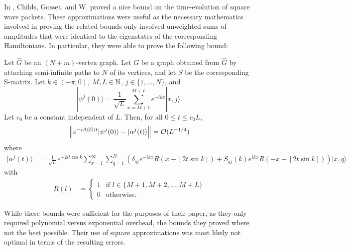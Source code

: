 \documentclass[../thesis-main/thesis-main]{subfiles}
\begin{document}
In \cite{MPQW}, Childs, Gosset, and W. proved a nice bound on the time-evolution of square wave packets.  These approximations were useful as the necessary mathematics involved in proving the related bounds only involved unweighted sums of amplitudes that were identical to the eigenstates of the corresponding Hamiltonians.  In particular, they were able to prove the following bound:
\begin{theorem}
Let $\widehat{G}$ be an $(N+m)$-vertex graph. Let $G$ be a graph obtained from $\widehat{G}$ by attaching semi-infinite paths to $N$ of its vertices, and let $S$ be the corresponding S-matrix.  Let $k\in(-\pi,0)$, $M,L\in\mathbb{N}$, $j\in\{1,\ldots,N\}$, and
\begin{equation}
  |\psi^{j}(0)\rangle=\frac{1}{\sqrt{L}}\sum_{x=M+1}^{M+L}e^{-ikx}|x,j\rangle.
\end{equation}
Let $c_{0}$ be a constant independent of $L$. Then, for all $0\leq t\leq c_{0}L$,
\begin{equation}
  \left\Vert e^{-iA(G) t}|\psi^{j}(0)\rangle-|\alpha^{j}(t)\rangle\right\Vert =\mathcal{O}(L^{-{1}/{4}})
\end{equation}
where 
\begin{align}
  |\alpha^{j}(t)\rangle & =  \frac{1}{\sqrt{L}}e^{-2it\cos k}\sum_{x=1}^{\infty}\sum_{q=1}^{N}\left(\delta_{qj} e^{-ikx}R(x-\left\lfloor 2t\sin k\right\rfloor)+S_{qj}(k)e^{ikx}R(-x-\left\lfloor 2t\sin k\right\rfloor)\right)|x,q\rangle
\end{align}
with
\begin{align}
R(l) & =  \begin{cases}
1 & \text{if }l\in\{M+1,M+2,\ldots,M+L\}\\
0 & \text{otherwise.}\end{cases}
\end{align}
\end{theorem}

While these bounds were sufficient for the purposes of their paper, as they only required polynomial versus exponential overhead, the bounds they proved where not the best possible.  Their use of square approximations was most likely not optimal in terms of the resulting errors.  
\end{document}
